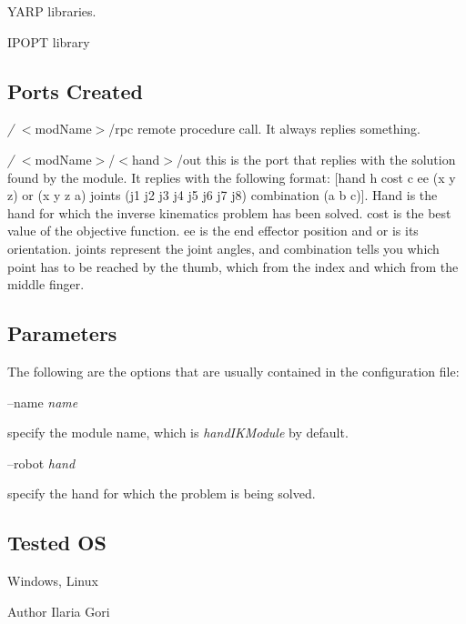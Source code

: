 \begin{DoxyItemize}
\item Y\+A\+R\+P libraries.
\item I\+P\+O\+P\+T library
\end{DoxyItemize}\hypertarget{group__handIKModule_portsc_sec}{}\subsection{Ports Created}\label{group__handIKModule_portsc_sec}

\begin{DoxyItemize}
\item {\itshape /} $<$mod\+Name$>$/rpc remote procedure call. It always replies something.
\item {\itshape /} $<$mod\+Name$>$/$<$hand$>$/out this is the port that replies with the solution found by the module. It replies with the following format\+: \mbox{[}hand h cost c ee (x y z) or (x y z a) joints (j1 j2 j3 j4 j5 j6 j7 j8) combination (a b c)\mbox{]}. Hand is the hand for which the inverse kinematics problem has been solved. cost is the best value of the objective function. ee is the end effector position and or is its orientation. joints represent the joint angles, and combination tells you which point has to be reached by the thumb, which from the index and which from the middle finger.
\end{DoxyItemize}\hypertarget{group__handIKModule_parameters_sec}{}\subsection{Parameters}\label{group__handIKModule_parameters_sec}
The following are the options that are usually contained in the configuration file\+:

--name {\itshape name} 
\begin{DoxyItemize}
\item specify the module name, which is {\itshape hand\+I\+K\+Module} by default.
\end{DoxyItemize}

--robot {\itshape hand} 
\begin{DoxyItemize}
\item specify the hand for which the problem is being solved.
\end{DoxyItemize}\hypertarget{group__handIKModule_tested_os_sec}{}\subsection{Tested O\+S}\label{group__handIKModule_tested_os_sec}
Windows, Linux

\begin{DoxyAuthor}{Author}
Ilaria Gori 
\end{DoxyAuthor}
